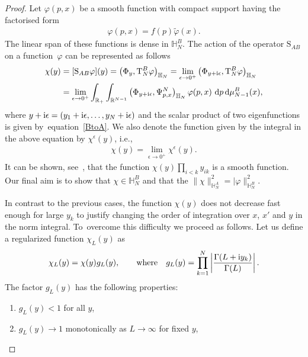 \documentclass[pdftex]{sigma}%
\numberwithin{equation}{section}
\begin{document}
\begin{proof}
Let $\varphi(p,x)$ be a smooth function with compact support having the factorised form %
\begin{align}\label{f-factor-form}
\varphi(p,x)=f(p) \tilde \varphi(x). %
\end{align}
The linear span of these functions is dense in $\mathbb H_N^B$. The action of the operator $\mathrm S_{AB}$ on a func\-tion~$\varphi$ can be
represented as follows
\begin{align}\label{def;SAB}
\chi(y)& =[\mathrm S_{AB}\varphi](y) = \big( \Phi_y, \mathrm T_N^B \varphi \big)_{\mathbb H_N}
=\lim_{\epsilon\to 0^+} \big( \Phi_{y+{\rm i}\epsilon}, \mathrm T_N^B \varphi \big)_{\mathbb H_N} \notag
\\
&=\lim_{\epsilon\to 0^+} \int_{\mathbb R_+} \int_{\mathbb R^{N-1}} \big( \Phi_{y+{\rm i}\epsilon},\Psi^N_{p,{x}} \big)_{\mathbb H_N} \,\varphi(p, x)\,
 \, {\rm d}p\, {\rm d}\mu_{N-1}^B(x),
\end{align}
where $y+{\rm i}\epsilon=(y_1+{\rm i}\epsilon,\dots,y_N+{\rm i}\epsilon)$ and the scalar product of two eigenfunctions is given by~equa\-tion~\eqref{BtoA}. We also
denote the function given by the integral in the above equation by $\chi^\epsilon(y)$, i.e.,
\begin{gather*}
\chi(y)=\lim_{\epsilon\to 0^+}\chi^\epsilon(y).
\end{gather*}
It can be shown, see~\cite[Lemma~3.1]{Kozlowski:2014jka}, that the function $\chi( y)\prod_{i<k} y_{ik} $ is a smooth function. Our final aim is to show that $\chi\in \mathbb H_N^B$ and that the $\|\chi\|^2_{\mathbb H_N^A}=|\varphi\|^2_{\mathbb H_N^B}$.

In contrast to the previous cases, the function $\chi(y)$ does not decrease fast enough for large $ y_k $ to justify changing the order of
integration over $x$, $x'$ and $ y $ in the norm integral. To~overcome this difficulty we proceed as follows. Let us define a regularized
function $\chi_L( y)$ as
\begin{gather*}
\chi_L( y)=\chi(y) g_L( y), \qquad \text{where} \quad
g_L( y)=\prod_{k=1}^N\left|\frac{\Gamma(L+{\rm i}y_k)}{\Gamma(L)}\right|.
\end{gather*}
The factor $g_L(y)$ has the following properties:
\begin{enumerate}[label=($\roman*$)]

\item $g_L( y)<1$ for all $ y$,%

\item $g_L(y)\to 1$ monotonically as $L\to\infty$ for fixed $y$,%


\end{enumerate}
\end{proof}
\end{document}
